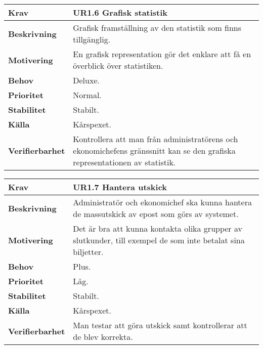 \documentclass[a4paper, twoside, 11pt, titlepage]{article}
\begin{document}
		\begin{tabular} { p{2.6cm} p{12.5cm} }
			\hline
			\sffamily\textbf{Krav} & \sffamily\textbf{UR1.6 Grafisk statistik  } \\
			\hline
			\sffamily\textbf{Beskrivning} & Grafisk framställning av den statistik som finns tillgänglig.  \\
			\hline
			\sffamily\textbf{Motivering} & En grafisk representation gör det enklare att få en överblick över statistiken.  \\
			\hline
			\sffamily\textbf{Behov} & Deluxe.  \\
			\hline
			\sffamily\textbf{Prioritet} & Normal.  \\
			\hline
			\sffamily\textbf{Stabilitet} & Stabilt.  \\
			\hline
			\sffamily\textbf{Källa} & Kårspexet.  \\
			\hline
			\sffamily\textbf{Verifierbarhet} & Kontrollera att man från administratörens och ekonomichefens gränssnitt kan se den grafiska representationen av statistik.  \\
			\hline
		\end{tabular}
		\vspace{6mm}

		\begin{tabular} { p{2.6cm} p{12.5cm} }
			\hline
			\sffamily\textbf{Krav} & \sffamily\textbf{UR1.7 Hantera utskick  } \\
			\hline
			\sffamily\textbf{Beskrivning} & Administratör och ekonomichef ska kunna hantera de massutskick av epost som görs av systemet.  \\
			\hline
			\sffamily\textbf{Motivering} & Det är bra att kunna kontakta olika grupper av slutkunder, till exempel de som inte betalat sina biljetter.  \\
			\hline
			\sffamily\textbf{Behov} & Plus.  \\
			\hline
			\sffamily\textbf{Prioritet} & Låg.  \\
			\hline
			\sffamily\textbf{Stabilitet} & Stabilt.  \\
			\hline
			\sffamily\textbf{Källa} & Kårspexet.  \\
			\hline
			\sffamily\textbf{Verifierbarhet} & Man testar att göra utskick samt kontrollerar att de blev korrekta.  \\
			\hline
		\end{tabular}
		\vspace{6mm}
\end{document}
